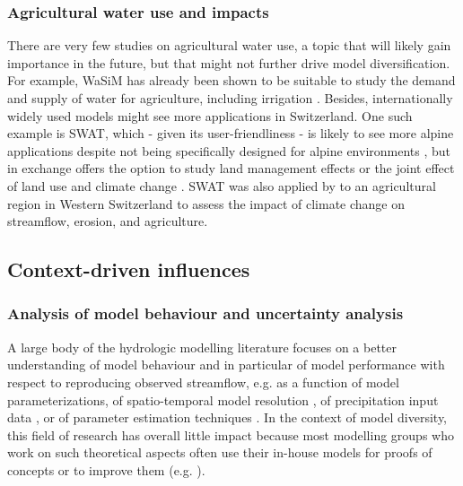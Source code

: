 \documentclass[10pt,a4paper]{article}
\begin{document}
\subsubsection{Agricultural water use and impacts}
\label{sec:application:agriculture}

There are very few studies on agricultural water use, a topic that will likely gain importance in the future, but that might not further drive model diversification. For example, WaSiM has already been shown to be suitable to study the demand and supply of water for agriculture, including irrigation \citep{Fuhrer2012}. Besides, internationally widely used models might see more applications in Switzerland. One such example is SWAT, which - given its user-friendliness \citep{Abbaspour2007} - is likely to see more alpine applications despite not being specifically designed for alpine environments \citep{Rahman2014, Andrianaki2019}, but in exchange offers the option to study land management effects \citep{Zarrineh2018} or the joint effect of land use and climate change \citep{Rahman2015}. SWAT was also applied by \citet{Zarrineh2020} to an agricultural region in Western Switzerland to assess the impact of climate change on streamflow, erosion, and agriculture.


\subsection{Context-driven influences}
\label{sec:application:context}


\subsubsection{Analysis of model behaviour and uncertainty analysis}
\label{sec:application:uncertainty}

A large body of the hydrologic modelling literature focuses on a better understanding of model behaviour and in particular of model performance with respect to reproducing observed streamflow, e.g. as a function of model parameterizations, of spatio-temporal model resolution \citep{Brunner_2019}, of precipitation input data \citep{Sikorska2016, Sikorska2017, Muller-Thomy2019}, or of parameter estimation techniques \citep{Foglia2009, Cullmann2011}. In the context of model diversity, this field of research has overall little impact because most modelling groups who work on such theoretical aspects often use their in-house models for proofs of concepts or to improve them (e.g. \citealt{Schaefli2007, Hingray2010}).
\end{document}
